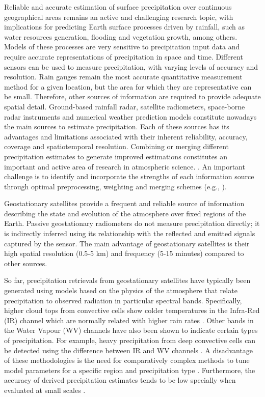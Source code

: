 \documentclass[3p,times]{elsarticle}
\begin{document}
Reliable and accurate estimation of surface precipitation over continuous geographical areas remains an active and challenging research topic, with implications for predicting Earth surface processes driven by rainfall, such as water resources generation, flooding and vegetation growth, among others. Models of these processes are very sensitive to precipitation input data and require accurate representations of precipitation in space and time. Different sensors can be used to measure precipitation, with varying levels of accuracy and resolution. Rain gauges remain the most accurate quantitative measurement method for a given location, but the area for which they are representative can be small. Therefore, other sources of information are required to provide adequate spatial detail. Ground-based rainfall radar, satellite radiometers, space-borne radar instruments and numerical weather prediction models constitute nowadays the main sources to estimate precipitation. Each of these sources has its advantages and limitations associated with their inherent reliability, accuracy, coverage and spatiotemporal resolution. Combining or merging different precipitation estimates to generate improved estimations constitutes an important and active area of research in atmospheric science. \citep{gourley2002exploratory,sideris2014real,nerini2015comparative,hasan2016merging}. An important challenge is to identify and incorporate the strengths of each information source through optimal preprocessing, weighting and merging schemes (e.g., \citep{beck2019mswep,beck2020evaluation}). 

Geostationary satellites provide a frequent and reliable source of information describing the state and evolution of the atmosphere over fixed regions of the Earth. Passive geostationary radiometers do not measure precipitation directly; it is indirectly inferred using its relationship with the reflected and emitted signals captured by the sensor. The main advantage of geostationary satellites is their high spatial resolution (0.5-5 km) and frequency (5-15 minutes) compared to other sources.

So far, precipitation retrievals from geostationary satellites have typically been generated using models based on the physics of the atmosphere that relate precipitation to observed radiation in particular spectral bands. Specifically, higher cloud tops from convective cells show colder temperatures in the Infra-Red (IR) channel which are normally related with higher rain rates \citep{scofield1987nesdis,vicente1998operational}. Other bands in the Water Vapour (WV) channels have also been shown to indicate certain types of precipitation. For example, heavy precipitation from deep convective cells can be detected using the difference between IR and WV channels \citep{kurino1997satellite,schmetz1997monitoring}. A disadvantage of these methodologies is the need for comparatively complex methods to tune model parameters for a specific region and precipitation type \citep{aemetsaf2013}. Furthermore, the accuracy of derived precipitation estimates tends to be low specially when evaluated at small scales \citep{arkin1987relationship}.
\end{document}
